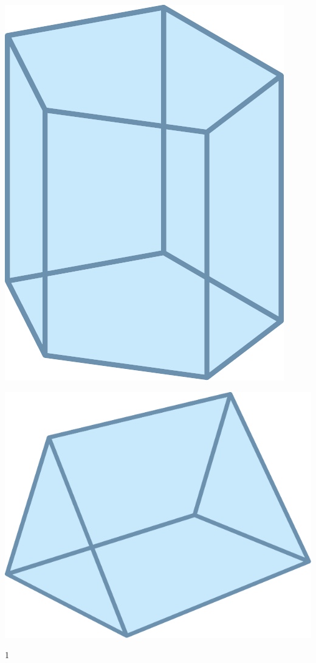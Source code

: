\documentclass[a4paper,11pt]{report}
\begin{document}
\begin{exop}
{\begin{tasks}
\includegraphics[scale=0.3]{media/es-21/prism_penta_blue}
\task

\includegraphics[scale=0.3]{media/es-21/prism_triang_blue}
\end{tasks}
}{1}
\end{exop}
\end{document}
